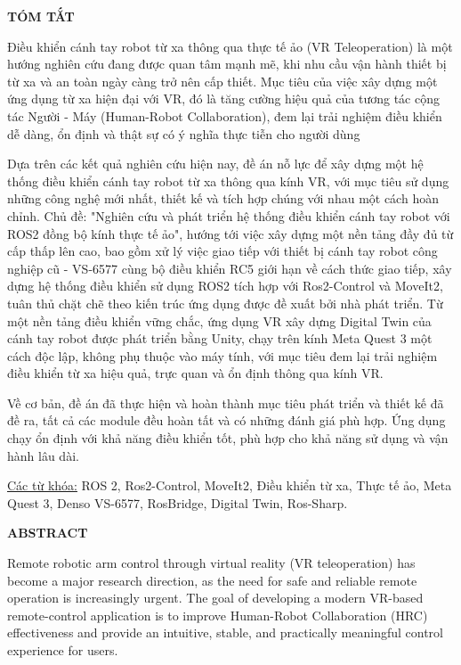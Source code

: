 \vspace*{0.5cm}
\begin{center}
    \textbf{TÓM TẮT}
\end{center}

Điều khiển cánh tay robot từ xa thông qua thực tế ảo (VR Teleoperation) là một hướng nghiên cứu đang được quan tâm mạnh mẽ, khi nhu cầu vận hành thiết bị từ xa và an toàn ngày càng trở nên cấp thiết. Mục tiêu của việc xây dựng một ứng dụng từ xa hiện đại với VR, đó là tăng cường hiệu quả của tương tác cộng tác Người - Máy (Human-Robot Collaboration), đem lại trải nghiệm điều khiển dễ dàng, ổn định và thật sự có ý nghĩa thực tiễn cho người dùng

Dựa trên các kết quả nghiên cứu hiện nay, đề án nỗ lực để xây dựng một hệ thống điều khiển cánh tay robot từ xa thông qua kính VR, với mục tiêu sử dụng những công nghệ mới nhất, thiết kế và tích hợp chúng với nhau một cách hoàn chỉnh. Chủ đề: "Nghiên cứu và phát triển hệ thống điều khiển cánh tay robot với ROS2 đồng bộ kính thực tế ảo", hướng tới việc xây dựng một nền tảng đầy đủ từ cấp thấp lên cao, bao gồm xử lý việc giao tiếp với thiết bị cánh tay robot công nghiệp cũ - VS-6577 cùng bộ điều khiển RC5 giới hạn về cách thức giao tiếp, xây dựng hệ thống điều khiển sử dụng ROS2 tích hợp với Ros2-Control và MoveIt2, tuân thủ chặt chẽ theo kiến trúc ứng dụng được đề xuất bởi nhà phát triển. Từ một nền tảng điều khiển vững chắc, ứng dụng VR xây dựng Digital Twin của cánh tay robot được phát triển bằng Unity, chạy trên kính Meta Quest 3 một cách độc lập, không phụ thuộc vào máy tính, với mục tiêu đem lại trải nghiệm điều khiển từ xa hiệu quả, trực quan và ổn định thông qua kính VR.

Về cơ bản, đề án đã thực hiện và hoàn thành mục tiêu phát triển và thiết kế đã đề ra, tất cả các module đều hoàn tất và có những đánh giá phù hợp. Ứng dụng chạy ổn định với khả năng điều khiển tốt, phù hợp cho khả năng sử dụng và vận hành lâu dài.

\underline{Các từ khóa:} ROS 2, Ros2-Control, MoveIt2, Điều khiển từ xa, Thực tế ảo, Meta Quest 3, Denso VS-6577, RosBridge, Digital Twin, Ros-Sharp.

\newpage
{}
\vspace*{0.5cm}

\begin{center}
    \textbf{ABSTRACT}
\end{center}

Remote robotic arm control through virtual reality (VR teleoperation) has become a major research direction, as the need for safe and reliable remote operation is increasingly urgent. The goal of developing a modern VR-based remote-control application is to improve Human-Robot Collaboration (HRC) effectiveness and provide an intuitive, stable, and practically meaningful control experience for users.

